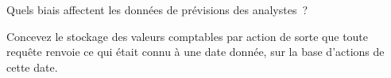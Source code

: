 \begin{interviewq}\label{iq:rs:fundamental-analyst-and-event-features:5}
Quels biais affectent les données de prévisions des analystes~?
\end{interviewq}

\begin{interviewq}\label{iq:rs:fundamental-analyst-and-event-features:6}
Concevez le stockage des valeurs comptables par action de sorte que toute requête renvoie ce qui était connu à une date donnée, sur la base d'actions de cette date.
\end{interviewq}
